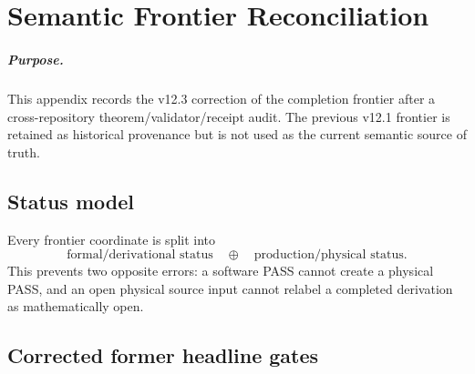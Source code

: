 \chapter{Semantic Frontier Reconciliation}
\label{app:v12_semantic_frontier_reconciliation}

\paragraph{Purpose.}
This appendix records the v12.3 correction of the completion frontier after a
cross-repository theorem/validator/receipt audit. The previous v12.1 frontier
is retained as historical provenance but is not used as the current semantic
source of truth.

\section{Status model}

Every frontier coordinate is split into
\[
\boxed{
\text{formal/derivational status}
\quad\oplus\quad
\text{production/physical status}.
}
\]
This prevents two opposite errors: a software PASS cannot create a physical
PASS, and an open physical source input cannot relabel a completed derivation
as mathematically open.

\section{Corrected former headline gates}

